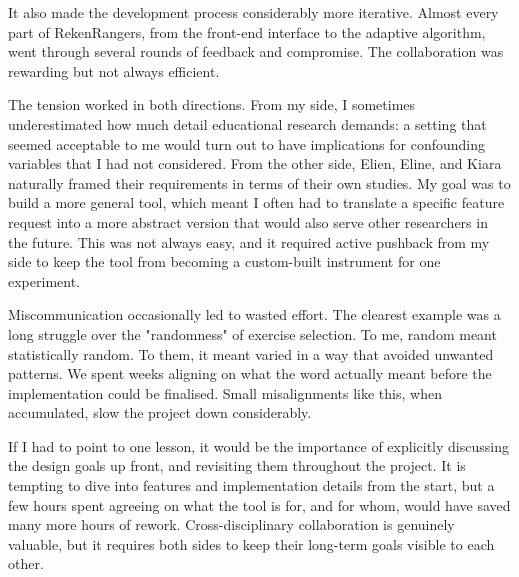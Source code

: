 It also made the development process considerably more iterative. Almost every part of RekenRangers, from the front-end interface to the adaptive algorithm, went through several rounds of feedback and compromise. The collaboration was rewarding but not always efficient.

The tension worked in both directions. From my side, I sometimes underestimated how much detail educational research demands: a setting that seemed acceptable to me would turn out to have implications for confounding variables that I had not considered. From the other side, Elien, Eline, and Kiara naturally framed their requirements in terms of their own studies. My goal was to build a more general tool, which meant I often had to translate a specific feature request into a more abstract version that would also serve other researchers in the future. This was not always easy, and it required active pushback from my side to keep the tool from becoming a custom-built instrument for one experiment.

Miscommunication occasionally led to wasted effort. The clearest example was a long struggle over the "randomness" of exercise selection. To me, random meant statistically random. To them, it meant varied in a way that avoided unwanted patterns. We spent weeks aligning on what the word actually meant before the implementation could be finalised. Small misalignments like this, when accumulated, slow the project down considerably.

If I had to point to one lesson, it would be the importance of explicitly discussing the design goals up front, and revisiting them throughout the project. It is tempting to dive into features and implementation details from the start, but a few hours spent agreeing on what the tool is for, and for whom, would have saved many more hours of rework. Cross-disciplinary collaboration is genuinely valuable, but it requires both sides to keep their long-term goals visible to each other.

